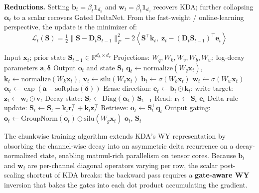 \textbf{Reductions.} Setting $\mathbf{b}_t = \beta_t \mathbf{1}_{d_k}$ and $\mathbf{w}_t = \beta_t \mathbf{1}_{d_v}$ recovers KDA; further collapsing $\boldsymbol{\alpha}_t$ to a scalar recovers Gated DeltaNet. From the fast-weight / online-learning perspective, the update is the minimizer of:
\[
\mathcal{L}_t(\mathbf{S}) = \tfrac{1}{2}\|\mathbf{S} - \mathbf{D}_t \mathbf{S}_{t-1}\|_F^2 - 2\left\langle \mathbf{S}^\top \mathbf{k}_t,\; \mathbf{z}_t - (\mathbf{D}_t \mathbf{S}_{t-1})^\top \mathbf{e}_t \right\rangle
\]

\begin{algorithm}[H]
\caption{Gated DeltaNet-2 Recurrent Forward (Reference Form)}
\begin{algorithmic}[1]
\Require Input $\mathbf{x}_t$; prior state $\mathbf{S}_{t-1} \in \mathbb{R}^{d_k \times d_v}$
\Require Projections: $W_q, W_k, W_v, W_b, W_w$; log-decay parameters $\mathbf{a}, \boldsymbol{\delta}$
\Ensure Output $\mathbf{o}_t$ and state $\mathbf{S}_t$
\State $\mathbf{q}_t \gets \mathrm{normalize}(W_q \mathbf{x}_t)$, $\mathbf{k}_t \gets \mathrm{normalize}(W_k \mathbf{x}_t)$, $\mathbf{v}_t \gets \mathrm{silu}(W_v \mathbf{x}_t)$
\State $\mathbf{b}_t \gets \sigma(W_b \mathbf{x}_t)$ 
\State $\mathbf{w}_t \gets \sigma(W_w \mathbf{x}_t)$ 
\State $\boldsymbol{\alpha}_t \gets \exp(\mathbf{a} - \mathrm{softplus}(\boldsymbol{\delta}))$ 
\State Erase direction: $\mathbf{e}_t \gets \mathbf{b}_t \odot \mathbf{k}_t$; write target: $\mathbf{z}_t \gets \mathbf{w}_t \odot \mathbf{v}_t$
\State Decay state: $\mathbf{S}_t \gets \mathrm{Diag}(\boldsymbol{\alpha}_t)\, \mathbf{S}_{t-1}$
\State Read: $\mathbf{r}_t \gets \mathbf{S}_t^\top \mathbf{e}_t$ 
\State Delta-rule update: $\mathbf{S}_t \gets \mathbf{S}_t - \mathbf{k}_t \mathbf{r}_t^\top + \mathbf{k}_t \mathbf{z}_t^\top$
\State Retrieve: $\mathbf{o}_t \gets \mathbf{S}_t^\top \mathbf{q}_t$
\State Output gating: $\mathbf{o}_t \gets \mathrm{GroupNorm}(\mathbf{o}_t) \odot \mathrm{silu}(W_g \mathbf{x}_t)$
\State \Return $\mathbf{o}_t$, $\mathbf{S}_t$
\end{algorithmic}
\end{algorithm}

The chunkwise training algorithm extends KDA's WY representation by absorbing the channel-wise decay into an asymmetric delta recurrence on a decay-normalized state, enabling matmul-rich parallelism on tensor cores. Because $\mathbf{b}_t$ and $\mathbf{w}_t$ are per-channel diagonal operators varying per row, the scalar post-scaling shortcut of KDA breaks: the backward pass requires a \textbf{gate-aware WY} inversion that bakes the gates into each dot product accumulating the gradient.

